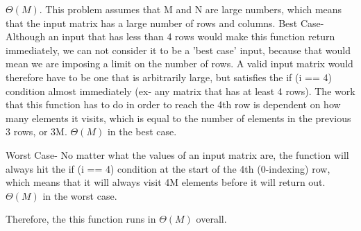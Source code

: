 \begin{blocksection}
\begin{solution}
$\Theta(M)$. This problem assumes that M and N are large numbers, which means that the input matrix has a large number of rows and columns. 
\newline 
Best Case- Although an input that has less than 4 rows would make this function return immediately, we can not consider it to be a 'best case' input, because that would mean we are imposing a limit on the number of rows. 
A valid input matrix would therefore have to be one that is arbitrarily large, but satisfies the if (i == 4) condition almost immediately (ex- any matrix that has at least 4 rows).
The work that this function has to do in order to reach the 4th row is dependent on how many elements it visits, which is equal to the number of elements in the previous 3 rows, or 3M.
$\Theta(M)$ in the best case.

Worst Case- No matter what the values of an input matrix are, the function will always hit the if (i == 4) condition at the start of the 4th (0-indexing) row, which means that it will always visit 4M elements before it will return out. 
$\Theta(M)$ in the worst case.

Therefore, the this function runs in $\Theta(M)$ overall.




\end{solution}
\end{blocksection}
